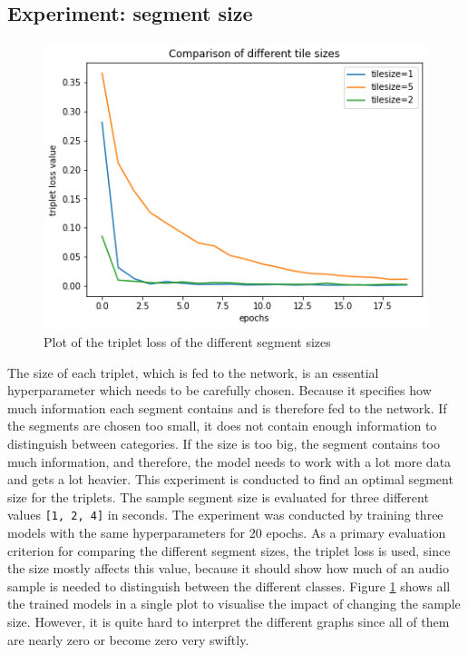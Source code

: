 \subsection{Experiment: segment size}
\label{sub:Experiment-Segment-Size}
\begin{figure}[hb]
\centering
    \includegraphics[width=0.5\linewidth]{study-doc/experiment_tile_size/assets/tile_sizes_plot.png}
    \caption{Plot of the triplet loss of the different segment sizes}
    \label{fig:tile-size-plot}
\end{figure}
\noindent
The size of each triplet, which is fed to the network, is an essential hyperparameter which needs to be carefully chosen. Because it specifies how much information each segment contains and is therefore fed to the network. If the segments are chosen too small, it does not contain enough information to distinguish between categories. If the size is too big, the segment contains too much information, and therefore, the model needs to work with a lot more data and gets a lot heavier. This experiment is conducted to find an optimal segment size for the triplets. The sample segment size is evaluated for three different values \texttt{[1, 2, 4]} in seconds.
\newline
\newline
The experiment was conducted by training three models with the same hyperparameters for 20 epochs. As a primary evaluation criterion for comparing the different segment sizes, the triplet loss is used, since the size mostly affects this value, because it should show how much of an audio sample is needed to distinguish between the different classes. Figure \ref{fig:tile-size-plot} shows all the trained models in a single plot to visualise the impact of changing the sample size. However, it is quite hard to interpret the different graphs since all of them are nearly zero or become zero very swiftly.
\newline
\newline
